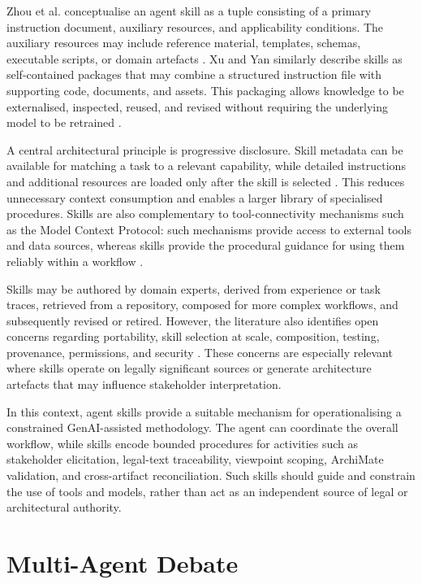 Zhou et al. conceptualise an agent skill as a tuple consisting of a primary instruction document, auxiliary resources, and applicability conditions. The auxiliary resources may include reference material, templates, schemas, executable scripts, or domain artefacts \cite{ZhouEtAl2026AgentSkills}. Xu and Yan similarly describe skills as self-contained packages that may combine a structured instruction file with supporting code, documents, and assets. This packaging allows knowledge to be externalised, inspected, reused, and revised without requiring the underlying model to be retrained \cite{XuYan2026AgentSkills}.

A central architectural principle is progressive disclosure. Skill metadata can be available for matching a task to a relevant capability, while detailed instructions and additional resources are loaded only after the skill is selected \cite{XuYan2026AgentSkills}. This reduces unnecessary context consumption and enables a larger library of specialised procedures. Skills are also complementary to tool-connectivity mechanisms such as the Model Context Protocol: such mechanisms provide access to external tools and data sources, whereas skills provide the procedural guidance for using them reliably within a workflow \cite{XuYan2026AgentSkills}.

Skills may be authored by domain experts, derived from experience or task traces, retrieved from a repository, composed for more complex workflows, and subsequently revised or retired. However, the literature also identifies open concerns regarding portability, skill selection at scale, composition, testing, provenance, permissions, and security \cite{ZhouEtAl2026AgentSkills,XuYan2026AgentSkills}. These concerns are especially relevant where skills operate on legally significant sources or generate architecture artefacts that may influence stakeholder interpretation.

In this context, agent skills provide a suitable mechanism for operationalising a constrained \ac{GenAI}-assisted methodology. The agent can coordinate the overall workflow, while skills encode bounded procedures for activities such as stakeholder elicitation, legal-text traceability, viewpoint scoping, ArchiMate validation, and cross-artifact reconciliation. Such skills should guide and constrain the use of tools and models, rather than act as an independent source of legal or architectural authority.

\section{Multi-Agent Debate}
\label{sec:multi-agent-debate}

